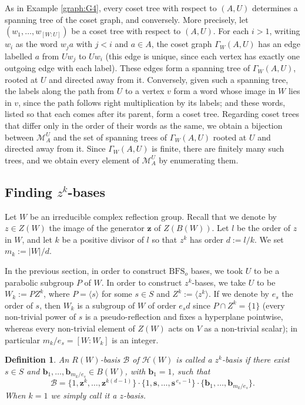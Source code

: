 \documentclass[11pt, reqno]{amsart}
\newcommand{\cH}{\mathcal{H}}
\newcommand{\cM}{\mathcal{M}}
\newcommand{\BFS}{\mathrm{BFS}}
\numberwithin{equation}{section}
\newtheorem{definition}[theorem]{Definition}
\theoremstyle{remark}
\begin{document}
As in Example \ref{graph:G4}, every coset tree with respect to $(A,U)$ determines a spanning tree of the coset graph, and conversely. More precisely, let $(w_1,\dots,w_{[W:U]})$ be a coset tree
with respect to $(A,U)$. For each $i>1$, writing $w_i$ as the word
$w_ja$ with $j<i$ and $a\in A$, the coset graph $\Gamma_W(A,U)$ has an edge
labelled $a$ from $Uw_j$ to $Uw_i$ (this edge is unique, since each vertex has exactly one outgoing edge with each label). These edges form a spanning tree of
$\Gamma_W(A,U)$, rooted at $U$ and directed away from it. Conversely, given
such a spanning tree, the labels along the path from $U$ to a vertex
$v$ form a word whose image in $W$ lies in $v$, since the path follows
right multiplication by its labels; and these words, listed so that
each comes after its parent, form a coset tree. Regarding coset trees
that differ only in the order of their words as the same, we obtain a
bijection between $\cM^U_A$ and the set of spanning trees of $\Gamma_W(A,U)$
rooted at $U$ and directed away from it. Since $\Gamma_W(A,U)$ is finite,
there are finitely many such trees, and we obtain every element of
$\cM^U_A$ by enumerating them.
	

	
	\subsection{Finding $z^k$-bases}
	Let $W$ be an irreducible complex reflection group. 
	Recall that we denote by $z\in Z(W)$  the image of the generator $\mathbf z$ of $Z(B(W))$.
	Let $l$ be the order of  $z$ in $W$, and let $k$ be a positive divisor of $l$ so that $z^k$ has
order $d:=l/k$. We set $m_k:=|W|/d$.
	
	In the previous section, in order to construct $\BFS_o$ bases, we took $U$ to be a parabolic subgroup $P$ of $W$.
In order to construct $z^k$-bases, we take $U$ to be $W_k:=PZ^k$, where $P=\langle s \rangle$ for some $s \in S$ and $Z^k:=\langle z^k\rangle$. 	If we denote by $e_s$ the order of $s$, then $W_k$ is a subgroup of $W$ of order $e_sd$ since $P \cap Z^k = \{1\}$ (every non-trivial power of $s$ is a pseudo-reflection and fixes a hyperplane pointwise, whereas every non-trivial element of $Z(W)$ acts on $V$ as a non-trivial scalar); in particular $m_k/e_s=[W:W_k]$ is an integer.



\begin{definition}\label{zk-basis}{\rm 
	An $R(W)$-basis $\mathcal{B}$ of $\cH(W)$ is called
	a \emph{$z^k$-basis} if there exist $s\in S$ and 	$\mathbf b_1,\ldots,\mathbf b_{m_k/e_s}\in B(W)$, with $\mathbf b_1=1$,
	such that
	\[
	\mathcal B
	=
	\{1,\mathbf z^{k},\ldots,\mathbf z^{k(d-1)}\}
	\cdot
	\{1,\mathbf s,\ldots,\mathbf s^{\,e_s-1}\}
	\cdot
	\{\mathbf b_1,\ldots,\mathbf b_{m_k/e_s}\}.
	\]
	When $k=1$ we simply call it a
	\emph{$z$-basis}.}
\end{definition}
\end{document}
